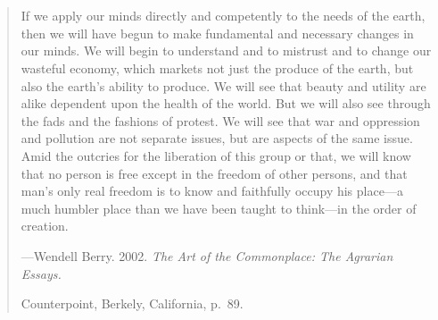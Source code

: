 

\chapter*{}
\chaptermark{}

\thispagestyle{empty} %

\vspace*{50 mm}

\small{}

\begin{quote}
	If we apply our minds directly and competently to the needs of the earth, 
	then we will have begun to make fundamental and necessary changes in our minds. 
	We will begin to understand and to mistrust and to change our wasteful economy, 
	which markets not just the produce of the earth, 
	but also the earth's ability to produce. 
	We will see that beauty and utility are alike dependent upon the health of the world. 
	But we will also see through the fads and the fashions of protest. 
	We will see that war and oppression and pollution are not separate issues, 
	but are aspects of the same issue. 
	Amid the outcries for the liberation of this group or that, 
	we will know that no person is free except in the freedom of other persons, 
	and that man's only real freedom 
	is to know and faithfully occupy his place---a much humbler place 
	than we have been taught to think---in the order of creation.
	
	\vspace{3 mm} %
	
	{
		\setlength{\parskip}{0.0pt} %
		\hfill---Wendell Berry. 2002. \emph{The Art of the Commonplace: The Agrarian Essays.}
	
		\hfill Counterpoint, Berkely, California, p.~89.
	}
\end{quote}


\normalsize{}
